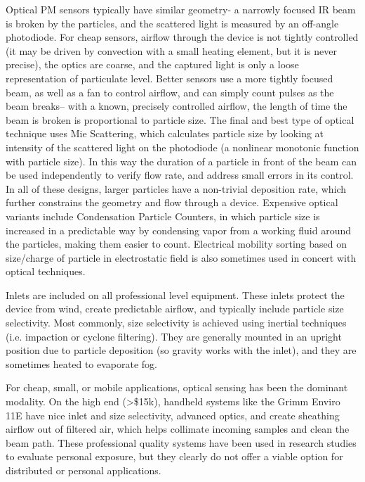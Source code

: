 Optical PM sensors typically have similar geometry- a narrowly focused IR beam is broken by the particles, and the scattered light is measured by an off-angle photodiode.  For cheap sensors, airflow through the device is not tightly controlled (it may be driven by convection with a small heating element, but it is never precise), the optics are coarse, and the captured light is only a loose representation of particulate level.  Better sensors use a more tightly focused beam, as well as a fan to control airflow, and can simply count pulses as the beam breaks-- with a known, precisely controlled airflow, the length of time the beam is broken is proportional to particle size.  The final and best type of optical technique uses Mie Scattering, which calculates particle size by looking at intensity of the scattered light on the photodiode (a nonlinear monotonic function with particle size). In this way the duration of a particle in front of the beam can be used independently to verify flow rate, and address small errors in its control.  In all of these designs, larger particles have a non-trivial deposition rate, which further constrains the geometry and flow through a device.   Expensive optical variants include Condensation Particle Counters, in which particle size is increased in a predictable way by condensing vapor from a working fluid around the particles, making them easier to count. Electrical mobility sorting based on size/charge of particle in electrostatic field is also sometimes used in concert with optical techniques.

Inlets are included on all professional level equipment.  These inlets protect the device from wind, create predictable airflow, and typically include particle size selectivity.  Most commonly, size selectivity is achieved using inertial techniques (i.e. impaction or cyclone filtering).  They are generally mounted in an upright position due to particle deposition (so gravity works with the inlet), and they are sometimes heated to evaporate fog.

For cheap, small, or mobile applications, optical sensing has been the dominant modality.  On the high end (>\$15k), handheld systems like the Grimm Enviro 11E have nice inlet and size selectivity, advanced optics, and create sheathing airflow out of filtered air, which helps collimate incoming samples and clean the beam path.  These professional quality systems have been used in research studies to evaluate personal exposure, but they clearly do not offer a viable option for distributed or personal applications.  

